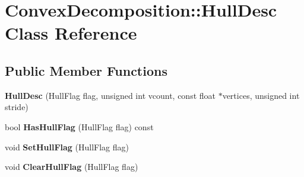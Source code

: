 \hypertarget{class_convex_decomposition_1_1_hull_desc}{\section{Convex\+Decomposition\+:\+:Hull\+Desc Class Reference}
\label{class_convex_decomposition_1_1_hull_desc}
}
\subsection*{Public Member Functions}
\begin{DoxyCompactItemize}
\item 
\hypertarget{class_convex_decomposition_1_1_hull_desc_aee00390cc1005ddfad8b756421f44394}{{\bfseries Hull\+Desc} (Hull\+Flag flag, unsigned int vcount, const float $\ast$vertices, unsigned int stride)}\label{class_convex_decomposition_1_1_hull_desc_aee00390cc1005ddfad8b756421f44394}

\item 
\hypertarget{class_convex_decomposition_1_1_hull_desc_a31f1ed13276bfaf84d8f062ccccaf4e3}{bool {\bfseries Has\+Hull\+Flag} (Hull\+Flag flag) const }\label{class_convex_decomposition_1_1_hull_desc_a31f1ed13276bfaf84d8f062ccccaf4e3}

\item 
\hypertarget{class_convex_decomposition_1_1_hull_desc_a475750f0509ebb3950e7fb3473fbfd6a}{void {\bfseries Set\+Hull\+Flag} (Hull\+Flag flag)}\label{class_convex_decomposition_1_1_hull_desc_a475750f0509ebb3950e7fb3473fbfd6a}

\item 
\hypertarget{class_convex_decomposition_1_1_hull_desc_addfb15d0dba97421374d187430fc4b94}{void {\bfseries Clear\+Hull\+Flag} (Hull\+Flag flag)}\label{class_convex_decomposition_1_1_hull_desc_addfb15d0dba97421374d187430fc4b94}

\end{DoxyCompactItemize}
